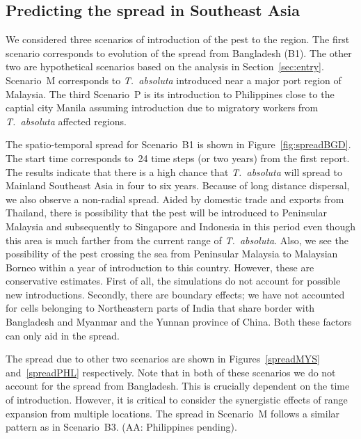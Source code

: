 \documentclass[11pt]{article}
\newcommand{\tuta}{\emph{T.~absoluta}}
\newcommand{\aacomment}[1]{({\color{magenta}AA: #1})}
\theoremstyle{definition}
\begin{document}
\subsection{Predicting the spread in Southeast Asia}
\label{sec:predict}
We considered three scenarios of introduction of the pest to the region.
The first scenario corresponds to evolution of the spread from Bangladesh
(B1). The other two are hypothetical scenarios based on the analysis in
Section~\ref{sec:entry}. Scenario~M corresponds to \tuta{} introduced near
a major port region of Malaysia. The third Scenario~P is its introduction
to Philippines close to the captial city Manila assuming introduction
due to migratory workers from \tuta{} affected regions.

The spatio-temporal spread for Scenario~B1 is shown in
Figure~\ref{fig:spreadBGD}. The start time corresponds to~24 time steps (or
two years) from the first report. The results indicate that there is a high
chance that \tuta{} will spread to Mainland Southeast Asia in four to six
years. Because of long distance dispersal, we also observe a non-radial
spread. Aided by domestic trade and exports from Thailand, there is
possibility that the pest will be introduced to Peninsular Malaysia and
subsequently to Singapore and Indonesia in this period even though this
area is much farther from the current range of \tuta{}. Also, we see the
possibility of the pest crossing the sea from Peninsular Malaysia to
Malaysian Borneo within a year of introduction to this country. However,
these are conservative estimates. First of all, the simulations do not
account for possible new introductions. Secondly, there are boundary
effects; we have not accounted for cells belonging to Northeastern parts of
India that share border with Bangladesh and Myanmar and the Yunnan province
of China. Both these factors can only aid in the spread.

The spread due to other two scenarios are shown in Figures~\ref{spreadMYS}
and~\ref{spreadPHL} respectively. Note that in both of these scenarios we do not
account for the spread from Bangladesh. This is crucially dependent on the
time of introduction. However, it is critical to consider the synergistic
effects of range expansion from multiple locations. The spread in
Scenario~M follows a similar pattern as in Scenario~B3.
\aacomment{Philippines pending}.
\end{document}
